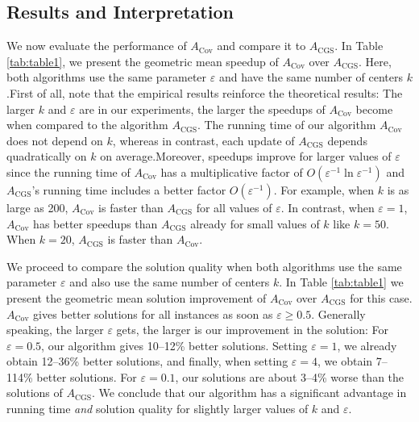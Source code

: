   
    \subsection{Results and Interpretation}    
    We now evaluate the performance of $A_{\text{Cov}}$ and compare it to $A_{\text{CGS}}$. In Table \ref{tab:table1}, we present the geometric mean speedup of $A_{\text{Cov}}$ over $A_{\text{CGS}}$. Here, both algorithms use the same parameter $\varepsilon$ and have the same number of centers $k$.First of all, note that the empirical results reinforce the theoretical results: The larger $k$ and $\varepsilon$ are in our experiments, the larger the speedups of $A_{\text{Cov}}$ become when compared to the algorithm $A_{\text{CGS}}$. The running time of our algorithm $A_{\text{Cov}}$ does not depend on $k$, whereas in contrast, each update of $A_{\text{CGS}}$ depends quadratically on $k$ on average.Moreover, speedups improve for larger values of $\varepsilon$ since the running time of $A_{\text{Cov}}$ has a multiplicative factor of $O(\varepsilon^{-1} \ln \varepsilon^{-1})$ and $A_{\text{CGS}}$'s running time includes a better factor $O(\varepsilon^{-1})$.   
    For example, when $k$ is as large as 200, $A_{\text{Cov}}$ is faster than $A_{\text{CGS}}$ for all values of $\varepsilon$. In contrast, when $\varepsilon = 1$, $A_{\text{Cov}}$ has better speedups than $A_{\text{CGS}}$ already for small values of $k$ like $k = 50$. When $k = 20$, $A_{\text{CGS}}$ is faster than $A_{\text{Cov}}$.  
    
    We proceed to compare the solution quality when both algorithms use the same parameter $\varepsilon$ and also use the same number of centers $k$. In Table \ref{tab:table1} we present the geometric mean solution improvement of $A_{\text{Cov}}$ over $A_{\text{CGS}}$ for this case.$A_{\text{Cov}}$ gives better solutions for all instances as soon as $\varepsilon \geq 0.5$. Generally speaking, the larger $\varepsilon$ gets, the larger is our improvement in the solution: For $\varepsilon = 0.5$, our algorithm gives 10--12\% better solutions. Setting $\varepsilon = 1$, we already obtain 12--36\% better solutions, and finally, when setting $\varepsilon = 4$, we obtain 7--114\% better solutions. For $\varepsilon = 0.1$, our solutions are about 3--4\% worse than the solutions of $A_{\text{CGS}}$. We conclude that our algorithm has a significant advantage in running time \textit{and} solution quality for slightly larger values of $k$ and $\varepsilon$.



